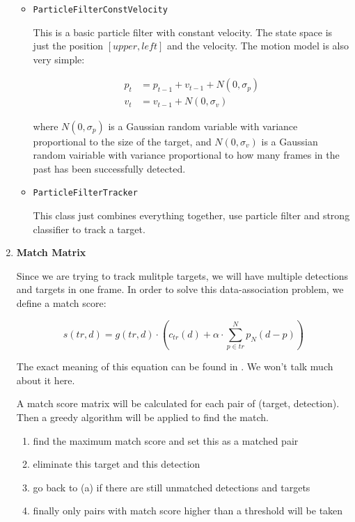 \documentclass[a4paper]{article}
\begin{document}
\begin{enumerate}
\begin{itemize}
\item \lstinline{ParticleFilterConstVelocity}

This is a basic particle filter with constant velocity. The state space is just the position $[upper, left]$ and the velocity. The motion model is also very simple:

\begin{align}
p_{t}&=p_{t-1}+v_{t-1}+N(0, \sigma_p)\\
v_{t}&=v_{t-1}+N(0, \sigma_v)
\end{align}

where $N(0, \sigma_p)$ is a Gaussian random variable with variance proportional to the size of the target, and $N(0, \sigma_v)$ is a Gaussian random vairiable with variance proportional to how many frames in the past has been successfully detected.

\item \lstinline{ParticleFilterTracker}

This class just combines everything together, use particle filter and strong classifier to track a target.

\end{itemize}

\item \textbf{Match Matrix}

Since we are trying to track mulitple targets, we will have multiple detections and targets in one frame. In order to solve this data-association problem, we define a match score\cite{eth_biwi_00633}:

\begin{equation}
s(tr, d)=g(tr, d)\cdot(c_{tr}(d)+\alpha\cdot\sum_{p\in tr}^{N}p_{N}(d-p))
\end{equation}

The exact meaning of this equation can be found in \cite{eth_biwi_00633}. We won't talk much about it here.

A match score matrix will be calculated for each pair of (target, detection). Then a greedy algorithm will be applied to find the match.

\begin{enumerate}
\item find the maximum match score and set this as a matched pair
\item eliminate this target and this detection
\item go back to (a) if there are still unmatched detections and targets
\item finally only pairs with match score higher than a threshold will be taken
\end{enumerate}


\end{enumerate}
\end{document}
